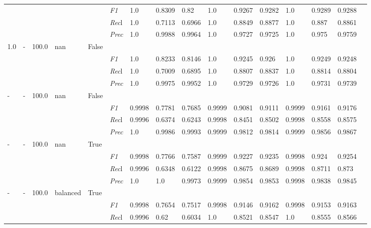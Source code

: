 \begin{table}[]
\begin{tabularx}{\textwidth}{XXXXX|X|XXX|XXX|XXXX}
& & & & & \textit{F1} & 1.0 & 0.8309 & 0.82 & 1.0 & 0.9267        & 0.9282        & 1.0        & 0.9289        & 0.9288        \\
& & & & & \textit{Rec}l & 1.0 & 0.7113 & 0.6966    & 1.0 & 0.8849    & 0.8877    & 1.0    & 0.887    & 0.8861    \\
& & & & & \textit{Prec} & 1.0 & 0.9988 & 0.9964 & 1.0 & 0.9727 & 0.9725 & 1.0 & 0.975 & 0.9759 \\ \midrule
1.0 & - & 100.0 & nan & False& & & & & & & & & \\
& & & & & \textit{F1} & 1.0 & 0.8233 & 0.8146 & 1.0 & 0.9245        & 0.926        & 1.0        & 0.9249        & 0.9248        \\
& & & & & \textit{Rec}l & 1.0 & 0.7009 & 0.6895    & 1.0 & 0.8807    & 0.8837    & 1.0    & 0.8814    & 0.8804    \\
& & & & & \textit{Prec} & 1.0 & 0.9975 & 0.9952 & 1.0 & 0.9729 & 0.9726 & 1.0 & 0.9731 & 0.9739 \\ \midrule
- & - & 100.0 & nan & False& & & & & & & & & \\
& & & & & \textit{F1} & 0.9998 & 0.7781 & 0.7685 & 0.9999 & 0.9081        & 0.9111        & 0.9999        & 0.9161        & 0.9176        \\
& & & & & \textit{Rec}l & 0.9996 & 0.6374 & 0.6243    & 0.9998 & 0.8451    & 0.8502    & 0.9998    & 0.8558    & 0.8575    \\
& & & & & \textit{Prec} & 1.0 & 0.9986 & 0.9993 & 0.9999 & 0.9812 & 0.9814 & 0.9999 & 0.9856 & 0.9867 \\ \midrule
- & - & 100.0 & nan & True& & & & & & & & & \\
& & & & & \textit{F1} & 0.9998 & 0.7766 & 0.7587 & 0.9999 & 0.9227        & 0.9235        & 0.9998        & 0.924        & 0.9254        \\
& & & & & \textit{Rec}l & 0.9996 & 0.6348 & 0.6122    & 0.9998 & 0.8675    & 0.8689    & 0.9998    & 0.8711    & 0.873    \\
& & & & & \textit{Prec} & 1.0 & 1.0 & 0.9973 & 0.9999 & 0.9854 & 0.9853 & 0.9998 & 0.9838 & 0.9845 \\ \midrule
- & - & 100.0 & balanced & True& & & & & & & & & \\
& & & & & \textit{F1} & 0.9998 & 0.7654 & 0.7517 & 0.9998 & 0.9146        & 0.9162        & 0.9998        & 0.9153        & 0.9163        \\
& & & & & \textit{Rec}l & 0.9996 & 0.62 & 0.6034    & 1.0 & 0.8521    & 0.8547    & 1.0    & 0.8555    & 0.8566    \\

\end{tabularx}
\end{table}

